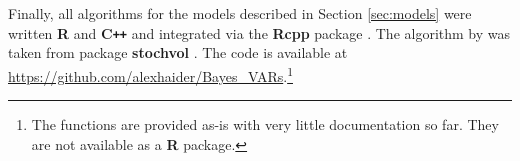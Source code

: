 \documentclass[12pt,letterpaper,fleqn]{article}           %
\begin{document}
Finally, all algorithms for the models described in Section \ref{sec:models} were written \textbf{\textsf{R}} and \textbf{\textsf{C}\texttt{++}} and integrated via the \textbf{\textsf{Rcpp}} package \parencite{eddel11, eddel17}. The algorithm by \textcite{kastner14} was taken from package \textbf{\textsf{stochvol}} \parencite{kastner16}. %
The code is available at \url{https://github.com/alexhaider/Bayes_VARs}.\footnote{The functions are provided as-is with very little documentation so far. They are not available as a \textbf{\textsf{R}} package.}

\clearpage
\printbibliography




 



% 



\end{document}

